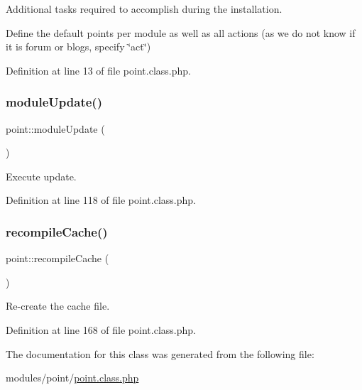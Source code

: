 Additional tasks required to accomplish during the installation. 

Define the default points per module as well as all actions (as we do not know if it is forum or blogs, specify \char`\"{}act\char`\"{})

Definition at line 13 of file point.\+class.\+php.

\mbox{\label{classpoint_a7741cbf1209b73247026a7178cfc83fe}} 
\subsubsection{\texorpdfstring{module\+Update()}{moduleUpdate()}}
{\footnotesize\ttfamily point\+::module\+Update (\begin{DoxyParamCaption}{ }\end{DoxyParamCaption})}



Execute update. 



Definition at line 118 of file point.\+class.\+php.

\mbox{\label{classpoint_a7019f188fb82f17f8d31cd6532aa8814}} 
\subsubsection{\texorpdfstring{recompile\+Cache()}{recompileCache()}}
{\footnotesize\ttfamily point\+::recompile\+Cache (\begin{DoxyParamCaption}{ }\end{DoxyParamCaption})}



Re-\/create the cache file. 



Definition at line 168 of file point.\+class.\+php.



The documentation for this class was generated from the following file\+:\begin{DoxyCompactItemize}
\item 
modules/point/\hyperlink{point_8class_8php}{point.\+class.\+php}\end{DoxyCompactItemize}
